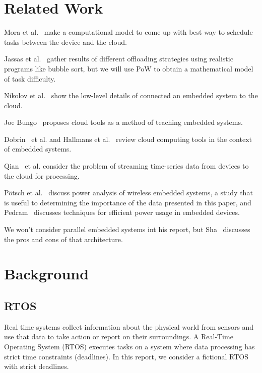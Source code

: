 \documentclass[twoside,twocolumn]{article}
\newcommand{\newp}{\newline\indent}
\begin{document}
\section{Related Work}

Mora et al.~\cite{mora} make a computational model to come up with best way to schedule tasks between the device and the cloud.

Jassas et al.~\cite{7946662} gather results of different offloading strategies using realistic programs like bubble sort, but we will use PoW to obtain a mathematical model of task difficulty.

Nikolov et al.~\cite{8825621} show the low-level details of connected an embedded system to the cloud.

Joe Bungo~\cite{5681660} proposes cloud tools as a method of teaching embedded systems.

Dobrin~\cite{7790777} et al. and Hallmans et al.~\cite{7281777} review cloud computing tools in the context of embedded systems.

Qian~\cite{abcd} et al. consider the problem of streaming time-series data from devices to the cloud for processing.

Pötsch et al.~\cite{7969658} discuss power analysis of wireless embedded systems, a study that is useful to determining the importance of the data presented in this paper, and Pedram~\cite{qqqq} discusses techniques for efficient power usage in embedded devices.

We won't consider parallel embedded systems int his report, but Sha~\cite{1544328} discusses the pros and cons of that architecture.


\section{Background}

\subsection{RTOS}

Real time systems collect information about the physical world from sensors and use that data to take action or report on their surroundings.
A Real-Time Operating System (RTOS) executes tasks on a system where data processing has strict time constraints (deadlines).
\newp In this report, we consider a fictional RTOS with strict deadlines.
\end{document}
